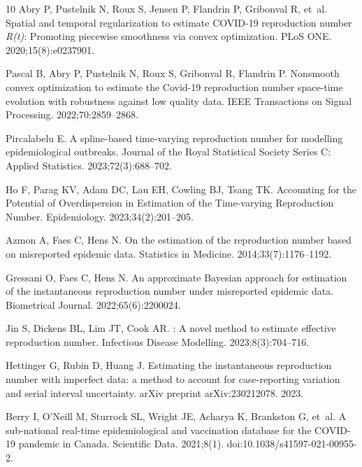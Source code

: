 \documentclass[10pt,letterpaper]{article}
\begin{document}
\begin{thebibliography}{10}
  Abry P, Pustelnik N, Roux S, Jensen P, Flandrin P, Gribonval R, et~al.
  \newblock Spatial and temporal regularization to estimate {COVID-19}
    reproduction number \emph{R(t)}: Promoting piecewise smoothness via convex
    optimization.
  \newblock PLoS ONE. 2020;15(8):e0237901.
  
  Pascal B, Abry P, Pustelnik N, Roux S, Gribonval R, Flandrin P.
  \newblock Nonsmooth convex optimization to estimate the {C}ovid-19 reproduction
    number space-time evolution with robustness against low quality data.
  \newblock IEEE Transactions on Signal Processing. 2022;70:2859--2868.
  
  Pircalabelu E.
  \newblock A spline-based time-varying reproduction number for modelling
    epidemiological outbreaks.
  \newblock Journal of the Royal Statistical Society Series C: Applied
    Statistics. 2023;72(3):688--702.
  
  Ho F, Parag KV, Adam DC, Lau EH, Cowling BJ, Tsang TK.
  \newblock Accounting for the Potential of Overdispersion in Estimation of the
    Time-varying Reproduction Number.
  \newblock Epidemiology. 2023;34(2):201--205.
  
  Azmon A, Faes C, Hens N.
  \newblock On the estimation of the reproduction number based on misreported
    epidemic data.
  \newblock Statistics in Medicine. 2014;33(7):1176--1192.
  
  Gressani O, Faes C, Hens N.
  \newblock An approximate {B}ayesian approach for estimation of the
    instantaneous reproduction number under misreported epidemic data.
  \newblock Biometrical Journal. 2022;65(6):2200024.
  
  Jin S, Dickens BL, Lim JT, Cook AR.
  : A novel method to estimate effective reproduction number.
  \newblock Infectious Disease Modelling. 2023;8(3):704--716.
  
  Hettinger G, Rubin D, Huang J.
  \newblock Estimating the instantaneous reproduction number with imperfect data:
    a method to account for case-reporting variation and serial interval
    uncertainty.
  \newblock arXiv preprint arXiv:230212078. 2023.
  
  Berry I, O'Neill M, Sturrock SL, Wright JE, Acharya K, Brankston G, et~al.
  \newblock A sub-national real-time epidemiological and vaccination database for
    the {COVID}-19 pandemic in Canada.
  \newblock Scientific Data. 2021;8(1).
  \newblock doi:{10.1038/s41597-021-00955-2}.
  

\end{thebibliography}
\end{document}
